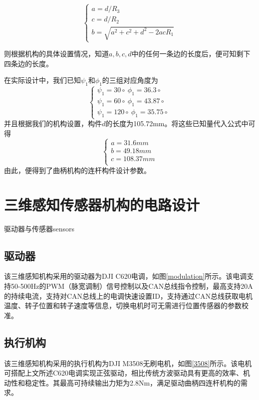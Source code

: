 $$ 
\begin{cases}
a = d / R_3 \\
c = d / R_2 \\
b = \sqrt{a^2 + c^2 + d^2 -2acR_1}
\end{cases}
$$

则根据机构的具体设置情况，知道$a,b,c,d$中的任何一条边的长度后，便可知剩下四条边的长度。

在实际设计中，我们已知$\psi_1$和$\phi_1$的三组对应角度为
$$ 
\begin{cases}
\psi_1=30\circ \ \phi_1=36.3\circ\\
\psi_1=60\circ \ \phi_1=43.87\circ\\
\psi_1=120\circ \  \phi_1=35.75\circ
\end{cases}
$$
并且根据我们的机构设置，构件$d$的长度为105.72mm。将这些已知量代入公式中可得
$$ 
\begin{cases}
a=31.6mm \\
b=49.18mm \\
c=108.37mm \\
\end{cases}
$$
由此，便得到了曲柄机构的连杆构件设计参数。

\section{三维感知传感器机构的电路设计}

\begin{pics}[htbp]{驱动器与传感器}{sensors}
\end{pics}

\subsection{驱动器}
该三维感知机构采用的驱动器为DJI C620电调，如图\ref{modulation}所示。该电调支持50-500Hz的PWM（脉宽调制）信号控制以及CAN总线指令控制，最高支持20A的持续电流，支持对CAN总线上的电调快速设置ID，支持通过CAN总线获取电机温度、转子位置和转子速度等信息，切换电机时可无需进行位置传感器的参数校准。

\subsection{执行机构}
该三维感知机构采用的执行机构为DJI M3508无刷电机，如图\ref{3508}所示。该电机可搭配上文所述C620电调实现正弦驱动，相比传统方波驱动具有更高的效率、机动性和稳定性。其最高可持续输出力矩为2.8Nm，满足驱动曲柄四连杆机构的需求。

